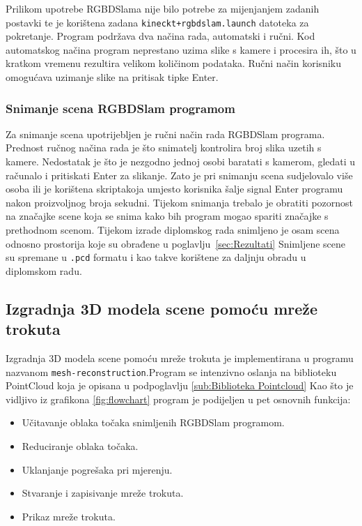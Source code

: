 Prilikom upotrebe RGBDSlama nije bilo potrebe za mijenjanjem zadanih
postavki te je korištena zadana \texttt{kineckt+rgbdslam.launch}
datoteka za pokretanje. Program podržava dva načina rada, automatski i
ručni. Kod automatskog načina program neprestano uzima slike s kamere i
procesira ih, što u kratkom vremenu rezultira velikom količinom
podataka. Ručni način korisniku omogućava uzimanje slike na pritisak
tipke Enter.


\newpage
\subsubsection{Snimanje scena RGBDSlam programom} %
\label{ssub:Snimanje scena RGBDSlam programom}

Za snimanje scena upotrijebljen je ručni način rada RGBDSlam programa.
Prednost ručnog načina rada je što snimatelj kontrolira broj slika
uzetih s kamere. Nedostatak je što je nezgodno jednoj osobi baratati s
kamerom, gledati u računalo i pritiskati Enter za slikanje. Zato je pri
snimanju scena sudjelovalo više osoba ili je korištena
skripta\footnotemark[1] koja umjesto korisnika šalje signal Enter
programu nakon proizvoljnog broja sekudni. Tijekom snimanja trebalo je
obratiti pozornost na značajke scene koja se snima kako bih program
mogao spariti značajke s prethodnom scenom. Tijekom izrade diplomskog
rada snimljeno je osam scena odnosno prostorija koje su obrađene u
poglavlju~\ref{sec:Rezultati} Snimljene scene su spremane u
\texttt{.pcd} formatu i kao takve korištene za daljnju obradu u
diplomskom radu.




\newpage
\subsection{Izgradnja 3D modela scene pomoću mreže trokuta} %
\label{sub:Izgradnja 3D modela scene pomoću mreže trokuta}

Izgradnja 3D modela scene pomoću mreže trokuta je implementirana u
programu nazvanom \texttt{mesh-reconstruction}.\footnotemark[1]
Program se intenzivno oslanja na biblioteku PointCloud koja je opisana u
podpoglavlju \ref{sub:Biblioteka Pointcloud} Kao što je vidljivo iz
grafikona \ref{fig:flowchart} program je podijeljen u pet osnovnih
funkcija:
\begin{itemize}
    \item Učitavanje oblaka točaka snimljenih RGBDSlam programom.
    \item Reduciranje oblaka točaka.
    \item Uklanjanje pogrešaka pri mjerenju.
    \item Stvaranje i zapisivanje mreže trokuta.
    \item Prikaz mreže trokuta.
\end{itemize}


